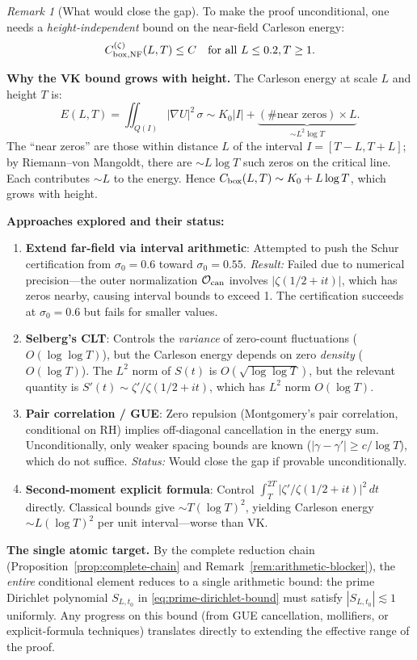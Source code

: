 \documentclass[11pt]{article}
\theoremstyle{definition}
\theoremstyle{remark}
\newtheorem{remark}[theorem]{Remark}
\theoremstyle{definition}
\begin{document}
\begin{remark}[What would close the gap]\label{rem:what-closes-gap}
To make the proof unconditional, one needs a \emph{height-independent} bound on the near-field Carleson energy:
\[
  C_{{\rm box},{\rm NF}}^{(\zeta)}(L, T) \le C \quad \text{for all } L \le 0.2, T \ge 1.
\]

\textbf{Why the VK bound grows with height.}
The Carleson energy at scale $L$ and height $T$ is:
\[
  E(L,T) = \iint_{Q(I)} |\nabla U|^2\,\sigma \sim K_0 |I| + \underbrace{(\text{\# near zeros}) \times L}_{\sim L^2 \log T}.
\]
The ``near zeros'' are those within distance $L$ of the interval $I = [T-L, T+L]$; by Riemann--von Mangoldt, there are $\sim L\log T$ such zeros on the critical line. Each contributes $\sim L$ to the energy. Hence $C_{{\rm box}}(L,T) \sim K_0 + L\log T$, which grows with height.

\textbf{Approaches explored and their status:}
\begin{enumerate}
\item \textbf{Extend far-field via interval arithmetic}: Attempted to push the Schur certification from $\sigma_0 = 0.6$ toward $\sigma_0 = 0.55$. \emph{Result:} Failed due to numerical precision---the outer normalization $\mathcal{O}_{\rm can}$ involves $|\zeta(1/2+it)|$, which has zeros nearby, causing interval bounds to exceed 1. The certification succeeds at $\sigma_0 = 0.6$ but fails for smaller values.

\item \textbf{Selberg's CLT}: Controls the \emph{variance} of zero-count fluctuations ($O(\log\log T)$), but the Carleson energy depends on zero \emph{density} ($O(\log T)$). The $L^2$ norm of $S(t)$ is $O(\sqrt{\log\log T})$, but the relevant quantity is $S'(t) \sim \zeta'/\zeta(1/2+it)$, which has $L^2$ norm $O(\log T)$.

\item \textbf{Pair correlation / GUE}: Zero repulsion (Montgomery's pair correlation, conditional on RH) implies off-diagonal cancellation in the energy sum. Unconditionally, only weaker spacing bounds are known ($|\gamma - \gamma'| \ge c/\log T$), which do not suffice. \emph{Status:} Would close the gap if provable unconditionally.

\item \textbf{Second-moment explicit formula}: Control $\int_{T}^{2T} |\zeta'/\zeta(1/2+it)|^2\,dt$ directly. Classical bounds give $\sim T(\log T)^2$, yielding Carleson energy $\sim L(\log T)^2$ per unit interval---worse than VK.
\end{enumerate}

\textbf{The single atomic target.}
By the complete reduction chain (Proposition~\ref{prop:complete-chain} and Remark~\ref{rem:arithmetic-blocker}), the \emph{entire} conditional element reduces to a single arithmetic bound: the prime Dirichlet polynomial $S_{L,t_0}$ in \eqref{eq:prime-dirichlet-bound} must satisfy $|S_{L,t_0}| \lesssim 1$ uniformly. Any progress on this bound (from GUE cancellation, mollifiers, or explicit-formula techniques) translates directly to extending the effective range of the proof.
\end{remark}
\end{document}
